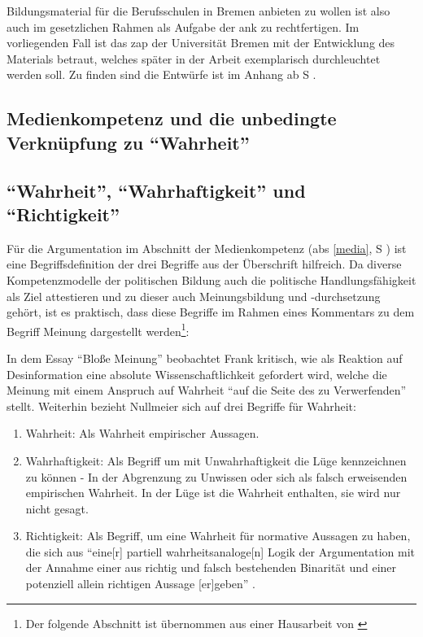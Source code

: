 Bildungsmaterial für die Berufsschulen in Bremen anbieten zu wollen ist also auch im gesetzlichen Rahmen als Aufgabe der \gls{ank} zu rechtfertigen.
Im vorliegenden Fall ist das \gls{zap} der Universität Bremen mit der Entwicklung des Materials betraut, welches später in der Arbeit exemplarisch durchleuchtet werden soll. Zu finden sind die Entwürfe ist im Anhang ab \gls{S} \pageref{MaterialkartenStart}. 




\subsection{Medienkompetenz und die unbedingte Verknüpfung zu \enquote{Wahrheit} \label{media}} 




\subsection{\enquote{Wahrheit}, \enquote{Wahrhaftigkeit} und \enquote{Richtigkeit} \label{wahr}}

Für die Argumentation im Abschnitt der Medienkompetenz (\gls{abs} \ref{media}, \gls{S} \pageref{media}) ist eine Begriffsdefinition der drei Begriffe aus der Überschrift hilfreich. Da diverse Kompetenzmodelle der politischen Bildung auch die politische Handlungsfähigkeit als Ziel attestieren und zu dieser auch Meinungsbildung und -durchsetzung gehört, ist es praktisch, dass diese Begriffe im Rahmen eines Kommentars zu dem Begriff Meinung dargestellt werden\footnote{Der folgende Abschnitt ist übernommen aus einer Hausarbeit von \textcite[4]{Klein2022}}:

In dem Essay \enquote{Bloße Meinung} beobachtet Frank \textcite[]{Nullmeier2019} kritisch, wie als Reaktion auf Desinformation eine absolute Wissenschaftlichkeit gefordert wird, welche die Meinung mit einem Anspruch auf Wahrheit \enquote{auf die Seite des zu Verwerfenden} \autocite{Nullmeier2019} stellt.  Weiterhin bezieht Nullmeier sich auf drei Begriffe für Wahrheit:
\begin{enumerate}
    \item Wahrheit: Als Wahrheit empirischer Aussagen.
    \item Wahrhaftigkeit: Als Begriff um mit Unwahrhaftigkeit die Lüge kennzeichnen zu können - In der Abgrenzung zu Unwissen oder sich als falsch erweisenden empirischen Wahrheit. In der Lüge ist die Wahrheit enthalten, sie wird nur nicht gesagt. 
    \item Richtigkeit: Als Begriff, um eine Wahrheit für normative Aussagen zu haben, die sich aus \enquote{eine[r] partiell wahrheitsanaloge[n] Logik der Argumentation mit der Annahme einer aus richtig und falsch bestehenden Binarität und einer potenziell allein richtigen Aussage [er]geben} \autocite{Nullmeier2019}.
\end{enumerate}

